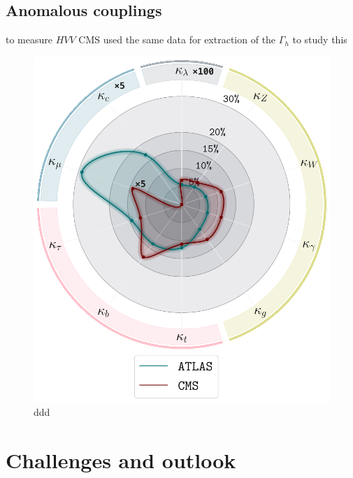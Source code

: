 \subsection{Anomalous couplings  }
to measure $HVV$ CMS used the same data for extraction of the $\Gamma_h$ to study this~\cite{CMS:2019ekd}
\begin{figure}[t!]
	\begin{center}
		\includegraphics[width=12cm]{figures/Higgs_couplings_poster}
		\caption{ddd  \label{fig:higgs_kappa}}
	\end{center}
\end{figure}
\newpage
\begingroup
 
\endgroup
\section{Challenges and outlook \label{sec:Higgscouplchallenge} }

